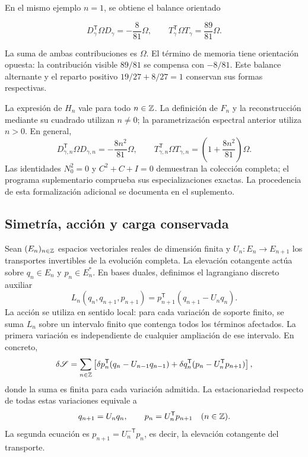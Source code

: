 En el mismo ejemplo \(n=1\), se obtiene el balance orientado



\begin{equation}
D_\gamma^{\mathsf T}\Omega D_\gamma=-\frac8{81}\Omega,
\qquad
T_\gamma^{\mathsf T}\Omega T_\gamma=\frac{89}{81}\Omega.
\label{nuc11:eq:33}
\end{equation}



La suma de ambas contribuciones es \(\Omega\).
El término de memoria tiene orientación opuesta:
la contribución visible \(89/81\) se compensa con \(-8/81\).
Este balance alternante y el reparto positivo
\(19/27+8/27=1\) conservan sus formas respectivas.

La expresión de \(H_n\) vale para todo \(n\in\mathbb Z\).
La definición de \(F_n\) y la reconstrucción mediante su cuadrado
utilizan \(n\ne0\); la parametrización espectral anterior utiliza
\(n>0\).
En general,
\[
 D_{\gamma,n}^{\mathsf T}\Omega D_{\gamma,n}
 =-\frac{8n^2}{81}\Omega,\qquad
 T_{\gamma,n}^{\mathsf T}\Omega T_{\gamma,n}
 =\left(1+\frac{8n^2}{81}\right)\Omega.
\]
Las identidades \(N_0^2=0\) y \(C^2+C+I=0\) demuestran la
colección completa; el programa suplementario comprueba sus
especializaciones exactas.
La procedencia de esta formalización adicional se documenta
en el suplemento.

\subsection{Simetría, acción y carga conservada}

Sean \((E_n)_{n\in\mathbb Z}\) espacios vectoriales reales de dimensión
finita y \(U_n:E_n\to E_{n+1}\) los transportes invertibles de
la evolución completa.
La elevación cotangente actúa sobre
\(q_n\in E_n\) y \(p_n\in E_n^*\).
En bases duales, definimos el lagrangiano discreto auxiliar
\[
 L_n(q_n,q_{n+1},p_{n+1})
 =p_{n+1}^{\mathsf T}(q_{n+1}-U_nq_n).
\]
La acción se utiliza en sentido local:
para cada variación de soporte finito, se suma \(L_n\) sobre un
intervalo finito que contenga todos los términos afectados.
La primera variación es independiente de cualquier ampliación
de ese intervalo. En concreto,
\begin{equation}
 \delta\mathscr S
 =\sum_{n\in\mathbb Z}
 \left[
  \delta p_n^{\mathsf T}(q_n-U_{n-1}q_{n-1})
  +\delta q_n^{\mathsf T}(p_n-U_n^{\mathsf T}p_{n+1})
 \right],
 \label{nuc11:accion-local}
\end{equation}
donde la suma es finita para cada variación admitida.
La estacionariedad respecto de todas estas variaciones equivale a
\[
 q_{n+1}=U_nq_n,\qquad
 p_n=U_n^{\mathsf T}p_{n+1}
 \quad(n\in\mathbb Z).
\]
La segunda ecuación es
\(p_{n+1}=U_n^{-\mathsf T}p_n\), es decir, la elevación
cotangente del transporte.


